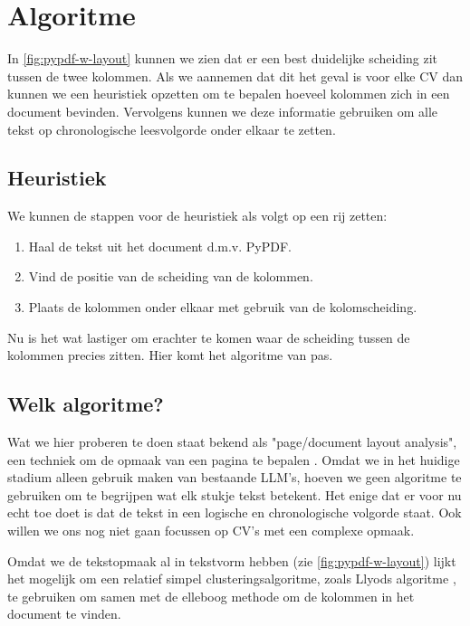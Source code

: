 \documentclass{article}
\begin{document}
\section{Algoritme}

In \ref{fig:pypdf-w-layout} kunnen we zien dat er een best duidelijke scheiding
zit tussen de twee kolommen. Als we aannemen dat dit het geval is voor elke CV
dan kunnen we een heuristiek opzetten om te bepalen hoeveel kolommen zich in een
document bevinden. Vervolgens kunnen we deze informatie gebruiken om alle tekst
op chronologische leesvolgorde onder elkaar te zetten.

\subsection{Heuristiek}

We kunnen de stappen voor de heuristiek als volgt op een rij zetten:

\begin{enumerate}
  \item Haal de tekst uit het document d.m.v. PyPDF.
  \item Vind de positie van de scheiding van de kolommen.
  \item Plaats de kolommen onder elkaar met gebruik van de kolomscheiding.
\end{enumerate}

Nu is het wat lastiger om erachter te komen waar de scheiding tussen de kolommen
precies zitten. Hier komt het algoritme van pas.

\subsection{Welk algoritme?}

Wat we hier proberen te doen staat bekend als "page/document layout analysis",
een techniek om de opmaak van een pagina te bepalen \cite{o-gorman-1993}.
Omdat we in het huidige stadium alleen gebruik maken van bestaande LLM's,
hoeven we geen algoritme te gebruiken om te begrijpen wat elk stukje tekst
betekent. Het enige dat er voor nu echt toe doet is dat de tekst in een logische
en chronologische volgorde staat. Ook willen we ons nog niet gaan focussen op
CV's met een complexe opmaak.

Omdat we de tekstopmaak al in tekstvorm hebben (zie \ref{fig:pypdf-w-layout})
lijkt het mogelijk om een relatief simpel clusteringsalgoritme, zoals Llyods
algoritme \cite{lloyd-1982}, te gebruiken om samen met de elleboog methode om de
kolommen in het document te vinden.
\end{document}
